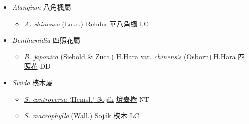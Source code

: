 
  \begin{itemize}
 \item[] \textit{Alangium} 八角楓屬
                    
  \begin{itemize}
        \item[] \href{http://www.theplantlist.org/tpl1.1/search?q=Alangium+chinense}{\textit{A. chinense} (Lour.) Rehder}   \href{\detokenize{http://taibnet.sinica.edu.tw/chi/taibnet_species_list.php?T2=華八角楓&T2_new_value=true&fr=y}}{華八角楓} LC
  \end{itemize}
 \item[] \textit{Benthamidia} 四照花屬
                    
  \begin{itemize}
        \item[] \href{http://www.theplantlist.org/tpl1.1/search?q=Benthamidia+japonica+var.+chinensis}{\textit{B. japonica} (Siebold \& Zucc.) H.Hara var. \textit{chinensis} (Osborn) H.Hara}   \href{\detokenize{http://taibnet.sinica.edu.tw/chi/taibnet_species_list.php?T2=四照花&T2_new_value=true&fr=y}}{四照花} DD
  \end{itemize}
 \item[] \textit{Swida} 梜木屬
                    
  \begin{itemize}
        \item[] \href{http://www.theplantlist.org/tpl1.1/search?q=Swida+controversa}{\textit{S. controversa} (Hemsl.) Soják}   \href{\detokenize{http://taibnet.sinica.edu.tw/chi/taibnet_species_list.php?T2=燈臺樹&T2_new_value=true&fr=y}}{燈臺樹} NT
        \item[] \href{http://www.theplantlist.org/tpl1.1/search?q=Swida+macrophylla}{\textit{S. macrophylla} (Wall.) Soják}   \href{\detokenize{http://taibnet.sinica.edu.tw/chi/taibnet_species_list.php?T2=梜木&T2_new_value=true&fr=y}}{梜木} LC
  \end{itemize}
  \end{itemize}
